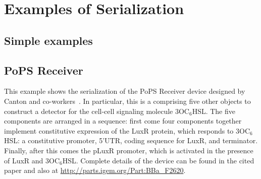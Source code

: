 \section{Examples of Serialization}
\label{ser:examples}
\subsection{Simple examples}

\subsection{PoPS Receiver}

This example shows the serialization of the PoPS Receiver device designed by Canton and co-workers~\cite{canton-natbio-2008}. 
In particular, this is a  comprising five other  objects to construct a detector for the cell-cell signaling molecule 3OC$_6$HSL.
The five components are arranged in a sequence:
first come four components together implement constitutive expression of the LuxR protein, which responds to 3OC$_6$HSL: a constitutive promoter, 5'UTR, coding sequence for LuxR, and terminator.
Finally, after this comes the pLuxR promoter, which is activated in the presence of LuxR and 3OC$_6$HSL.
%
Complete details of the device can be found in the cited paper and also at \url{http://parts.igem.org/Part:BBa_F2620}.

